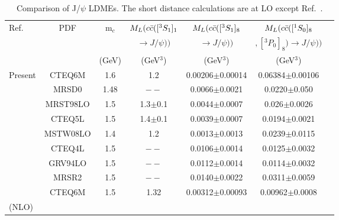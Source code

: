 \documentclass[aps,prc,preprint,superscriptaddress,showpacs,showkeys,amsmath]{revtex4-1}
\begin{document}
\begin{table}[h]
\caption{Comparison of J/$\psi$ LDMEs. The short distance calculations are at LO except Ref.~\cite{Butenschoen:2010rq}.}
\begin{tabular}{|l|c|c|c|c|c|c|}
\hline            
Ref.       &PDF     &m$_{c}$  &$M_{L}(c{\bar{c}}([^3S_1]_{1}$      &$M_{L}(c{\bar{c}}([^3S_1]_{8}$    &$M_{L}(c{\bar{c}}([^1S_0]_{8}$ \\
           &        &        &$\rightarrow J/\psi))$      &$\rightarrow J/\psi))$    &$,[^3P_0]_{8})\rightarrow J/\psi))$   \\
          &        &(GeV)   &(GeV$^{3}$)            &(GeV$^{3}$)   &(GeV$^{3}$)                                  \\
\hline
Present                        &CTEQ6M   &1.6     &1.2            &0.00206$\pm$0.00014  &0.06384$\pm$0.00106                           \\
\cite{Cho:1995vh}              &MRSD0    &1.48    &$--$           &0.0066$\pm$0.0021    &0.0220$\pm$0.050                                 \\
\cite{Braaten:1999qk}          &MRST98LO &1.5     &1.3$\pm$0.1    &0.0044$\pm$0.0007    &0.026$\pm$0.0026                                \\
\cite{Braaten:1999qk}          &CTEQ5L   &1.5     &1.4$\pm$0.1    &0.0039$\pm$0.0007    &0.0194$\pm$0.0021                                \\
\cite{Sharma:2012dy}           &MSTW08LO &1.4      &1.2            &0.0013$\pm$0.0013    &0.0239$\pm$0.0115                                \\
\cite{Beneke:1996yw}            &CTEQ4L   &1.5     &$--$           &0.0106$\pm$0.0014   &0.0125$\pm$0.0032                                \\
\cite{Beneke:1996yw}            &GRV94LO  &1.5     &$--$           &0.0112$\pm$0.0014   &0.0114$\pm$0.0032                                \\
\cite{Beneke:1996yw}            &MRSR2    &1.5     &$--$           &0.0140$\pm$0.0022   &0.0311$\pm$0.0059                                \\
\cite{Butenschoen:2010rq}      &CTEQ6M   &1.5     &1.32           &0.00312$\pm$0.00093 &0.00962$\pm$0.0008                              \\
                        (NLO)  &    &      &             &     &                                                                        \\
\hline
\end{tabular}
\label{table:LDMEJPsi}
\end{table}
\end{document}

